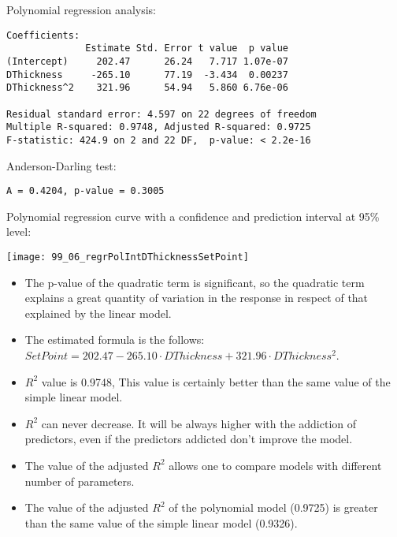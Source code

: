\begin{frame}[fragile]
  Polynomial regression analysis:\\
  \begin{small}
    \begin{verbatim}
Coefficients:
              Estimate Std. Error t value  p value
(Intercept)     202.47      26.24   7.717 1.07e-07
DThickness     -265.10      77.19  -3.434  0.00237
DThickness^2    321.96      54.94   5.860 6.76e-06

Residual standard error: 4.597 on 22 degrees of freedom
Multiple R-squared: 0.9748,	Adjusted R-squared: 0.9725 
F-statistic: 424.9 on 2 and 22 DF,  p-value: < 2.2e-16 
    \end{verbatim}
  \end{small}
  Anderson-Darling test:\\
  \begin{small}
    \begin{verbatim}
A = 0.4204, p-value = 0.3005
    \end{verbatim}
  \end{small}
\end{frame}

\begin{frame}
  Polynomial regression curve with a confidence and prediction interval at 95\% level:\\
  \vspace{.3cm}
  \begin{center}
    \texttt{[image: 99\_06\_regrPolIntDThicknessSetPoint]}
  \end{center}
\end{frame}

\begin{frame}
  \begin{small}
    \begin{itemize}
      \item The p-value of the quadratic term is significant, so the quadratic term explains a great quantity of variation in the response in respect of that explained by the linear model.
      \item The estimated formula is the follows: $ SetPoint = 202.47 - 265.10 \cdot DThickness + 321.96 \cdot DThickness^2 $.
      \item $ R^2 $ value is 0.9748, This value is certainly better than the same value of the simple linear model. 
      \item $ R^2 $ can never decrease. It will be always higher with the addiction of  predictors, even if the predictors addicted don't improve the model. 
      \item The value of the adjusted  $ R^2 $ allows one to compare models with different number of parameters.
      \item The value of the adjusted  $ R^2 $ of the polynomial model (0.9725) is greater than the same value of the simple linear model (0.9326).
    \end{itemize}
  \end{small}
\end{frame}

